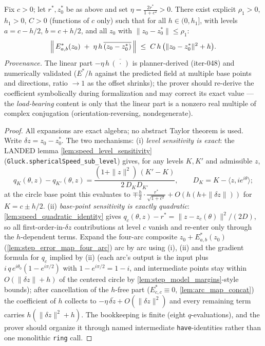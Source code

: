 \begin{lemma}
  \label{lem:step_error_expansion}
  Fix $c>0$; let $r^\ast,z_0^\ast$ be as above and set $\eta=\tfrac{2r^\ast}{1+c^2}>0$.
  There exist explicit $\rho_1>0$, $h_1>0$, $C>0$ (functions of $c$ only) such that for
  all $h\in(0,h_1]$, with levels $a=c-h/2$, $b=c+h/2$, and all $z_0$ with
  $\|z_0-z_0^\ast\|\le\rho_1$:
  \[
    \Bigl\|\,E^\ast_{a,b}(z_0)\;+\;\eta\,h\,\overline{(z_0-z_0^\ast)}\,\Bigr\|
    \;\le\;C\,h\,\bigl(\|z_0-z_0^\ast\|^2+h\bigr) .
  \]
  \emph{Provenance.} The linear part $-\eta\,h\,\overline{(\,\cdot\,)}$ is
  planner-derived (iter-048) and numerically validated ($E^\ast/h$ against the predicted
  field at multiple base points and directions, ratio $\to1$ as the offset shrinks);
  the prover should re-derive the coefficient symbolically during formalization and may
  correct its exact value — the \emph{load-bearing} content is only that the linear part
  is a nonzero real multiple of complex conjugation (orientation-reversing,
  nondegenerate).
\end{lemma}

\begin{proof}

\leanok
  All expansions are exact algebra; no abstract Taylor theorem is used. Write
  $\delta z=z_0-z_0^\ast$. The two mechanisms:
  (i) \emph{level sensitivity is exact}: the LANDED lemma
  \cref{lem:speed_level_sensitivity} (\texttt{Gluck.sphericalSpeed\_sub\_level}) gives,
  for any levels $K,K'$ and admissible $z$,
  \[
    q_K(\theta,z)-q_{K'}(\theta,z)
    =\frac{(1+\|z\|^2)\,(K'-K)}{2\,D_K D_{K'}},\qquad
    D_K=K-\langle z,ie^{i\theta}\rangle ;
  \]
  at the circle base point this evaluates to
  $\mp\tfrac{h}{2}\cdot\tfrac{r^\ast}{\sqrt{1+c^2}}+O(h(h+\|\delta z\|))$ for
  $K=c\pm h/2$.
  (ii) \emph{base-point sensitivity is exactly quadratic}:
  \cref{lem:speed_quadratic_identity} gives $q_c(\theta,z)-r^\ast=\|z-z_c(\theta)\|^2/
  (2D)$, so all first-order-in-$\delta z$ contributions at level $c$ vanish and
  re-enter only through the $h$-dependent terms.
  Expand the four-arc composite $z_0+E^\ast_{a,b}(z_0)$
  (\cref{lem:step_error_map_four_arc}) arc by arc using (i), (ii) and
  the gradient formula for $q_c$ implied by (ii) (each arc's output is the input plus
  $i\,q\,e^{i\theta_0}(1-e^{i\pi/2})$ with $1-e^{i\pi/2}=1-i$, and intermediate points
  stay within $O(\|\delta z\|+h)$ of the centered circle by
  \cref{lem:step_model_margins}-style bounds); after cancellation of the $h$-free part
  ($E^\ast_{c,c}\equiv0$, \cref{lem:arc_map_concat}) the coefficient of $h$ collects to
  $-\eta\,\overline{\delta z}+O(\|\delta z\|^2)$ and every remaining term carries
  $h(\|\delta z\|^2+h)$. The bookkeeping is finite (eight $q$-evaluations), and the
  prover should organize it through named intermediate \texttt{have}-identities rather
  than one monolithic \texttt{ring} call.
\end{proof}

